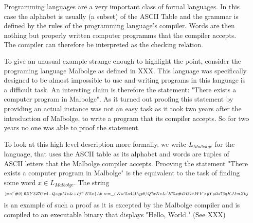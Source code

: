 \begin{example}Programming languages are a very important class of formal languages. In this case the alphabet is usually (a subset) of the ASCII Table and the grammar is defined by the rules of the programming language's compiler. Words are then nothing but properly written computer programms that the compiler accepts. The compiler can therefore be interpreted as the checking relation.

To give an unusual example strange enough to highlight the point, consider the programing language Malbolge as defined in XXX. This language was specifically designed to be almost impossible to use and writing programs in this language is a difficult task. An intersting claim is therefore the statement: "There exists a computer program in Malbolge". As it turned out proofing this statement by providing an actual instance was not an easy task as it took two years after the introduction of Malbolge, to write a program that its compiler accepts. So for two years no one was able to proof the statement.

To look at this high level description more formally, we write $L_{Malbolge}$ for the language, that uses the ASCII table as its alphabet and words are tuples of ASCII letters that the Malbolge compiler accepts. Prooving the statement "There exists a computer program in Malbolge" is the equivalent to the task of finding some word $x\in L_{Malbolge}$. The string
$$
\scriptstyle (=<'\#9]~6ZY327Uv4-QsqpMn\&+Ij"'E\%e\{Ab~w=\_:]Kw\%o44Uqp0/Q?xNvL:'H\%c\#DD2\wedge WV>gY;dts76qKJImZkj
$$
is an example of such a proof as it is excepted by the Malbolge compiler and is compiled to an executable binary that displays "Hello, World." (See XXX)
\end{example}
